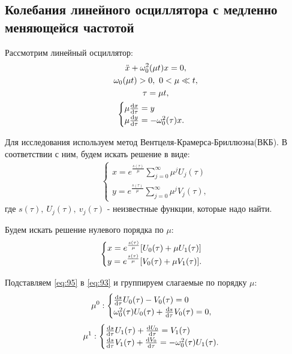 \subsection{Колебания линейного осциллятора с медленно меняющейся частотой}
Рассмотрим линейный осциллятор:
\begin{gather}
	\ddot{x}+\omega_0^2(\mu t)x=0, \\
	\label{eq:92}
	\omega_0(\mu t)>0,~0< \mu \ll t, \notag \\
	\tau=\mu t, \notag \\
	\begin{cases}
		\mu \dv{x}{\tau}=y \\
		\mu \dv{y}{\tau}=-\omega_0^2(\tau)x.
	\end{cases}	
	\label{eq:93}
\end{gather}

Для исследования используем метод Вентцеля-Крамерса-Бриллюэна(ВКБ). В соответствии с ним, будем искать решение в виде:
\begin{gather}
	\begin{cases}
		x=e^{\frac{s(\tau)}{\mu}}\sum\limits_{j=0}^{\infty}\mu^j U_j(\tau) \\
		y=e^{\frac{s(\tau)}{\mu}}\sum\limits_{j=0}^{\infty}\mu^j V_j(\tau),
	\end{cases}	
	\label{eq:94}
\end{gather}
где $s(\tau),~U_j(\tau),~v_j(\tau)$ - неизвестные функции, которые надо найти. 

Будем искать решение нулевого порядка по $\mu$:
\begin{gather}
	\begin{cases}
		x=e^{\frac{s(\tau)}{\mu}}\qty[U_0(\tau)+\mu U_1(\tau)] \\
		y=e^{\frac{s(\tau)}{\mu}}\qty[V_0(\tau)+\mu V_1(\tau)].
	\end{cases}	
	\label{eq:95}
\end{gather}

Подставляем \eqref{eq:95} в \eqref{eq:93} и группируем слагаемые по порядку $\mu$:
\begin{equation}
	\mu^0:
	\begin{cases}
		\dv{s}{\tau} U_0(\tau)-V_0(\tau)=0 \\
		\omega^2_0(\tau)U_0(\tau)+\dv{s}{\tau} V_0(\tau)=0, 		
	\end{cases}
	\label{eq:96}	
\end{equation}
\begin{equation}
	\mu^1:
	\begin{cases}
		\dv{s}{\tau} U_1(\tau)+\dv{U_0}{\tau}=V_1(\tau) \\
		\dv{s}{\tau} V_1(\tau)+\dv{V_0}{\tau}=-\omega^2_0(\tau)U_1(\tau). 		
	\end{cases}
	\label{eq:97}	
\end{equation}

